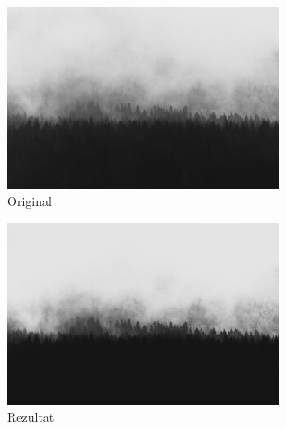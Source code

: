 \documentclass[12pt,a4paper]{article}
\theoremstyle{definition}
\theoremstyle{remark}
\theoremstyle{plain}
\begin{document}
\begin{multicols}{2}
\begin{figure}[H]
\centering
\includegraphics[width=8cm]{images/wood.jpeg}
  \caption{Original}\label{tree_fuzzy_grayscale_input}
\end{figure}
\columnbreak
\begin{figure}[H]
\centering
\includegraphics[width=8cm]{images/fuzzy_grayscale_1.jpg}
  \caption{Rezultat}\label{fuzzy_grayscale_output1}
\end{figure}
\end{multicols}
\end{document}
